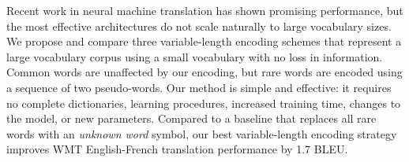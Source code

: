 Recent work in neural machine translation has shown promising performance, but
the most effective architectures do not scale naturally to large vocabulary
sizes. We propose and compare three variable-length encoding schemes that
represent a large vocabulary corpus using a small vocabulary with no loss in
information. Common words are unaffected by our encoding, but rare words are
encoded using a sequence of two pseudo-words. Our method is simple and
effective: it requires no complete dictionaries, learning procedures, increased
training time, changes to the model, or new parameters. Compared to a baseline
that replaces all rare words with an \emph{unknown word} symbol, our best
variable-length encoding strategy improves WMT English-French translation
performance by 1.7 BLEU.
